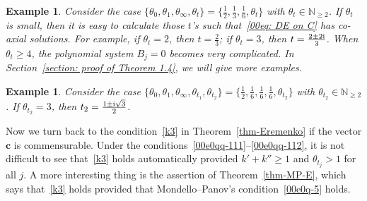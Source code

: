 \documentclass[10pt,a4paper]{amsart}
\numberwithin{equation}{section}
\newtheorem{Example}[Theorem]{Example}
\begin{document}
\begin{Example}
Consider the case
$\{\theta_0,\theta_1,\theta_\infty,\theta_t\}
=\bigl\{\frac12,\frac13,\frac16,\theta_t\bigr\}$
with $\theta_t\in\mathbb{N}_{\geq 2}$. If $\theta_t$ is small, then it
is easy to calculate those $t$'s such that~\eqref{00eq: DE on C} has
co-axial solutions. For example, if $\theta_t=2$, then $t=\frac23$; if
$\theta_t=3$, then $t=\frac{2\pm 2 {\rm i}}{3}$. When $\theta_t\geq 4$, the
polynomial system $B_j=0$ becomes very complicated. In Section~\ref{section: proof of Theorem 1.4}, we will give more examples.
\end{Example}

\begin{Example}
Consider the case $\{\theta_0,\theta_1,\theta_\infty,\theta_{t_1},\theta_{t_2}\}=\bigl\{\frac12,\frac16,\frac16,\frac16,\theta_{t_2}\bigr\}$ with $\theta_{t_2}\in\mathbb{N}_{\geq 2}$. If $\theta_{t_2}=3$, then $t_2=\frac{1\pm {\rm i}\sqrt{3}}{2}$.
\end{Example}

Now we turn back to the condition~\eqref{k3} in Theorem~\ref{thm-Eremenko} if the vector $\boldsymbol c$ is commensurable. Under the conditions~\eqref{00e0qq-111}--\eqref{00e0qq-112}, it is not difficult to see that~\eqref{k3} holds automatically provided $k'+k''\geq 1$ and $\theta_{t_j}>1$ for all $j$. A more interesting thing is the assertion of Theorem~\ref{thm-MP-E}, which says that~\eqref{k3} holds provided that Mondello--Panov's condition~\eqref{00e0q-5} holds.
\end{document}

